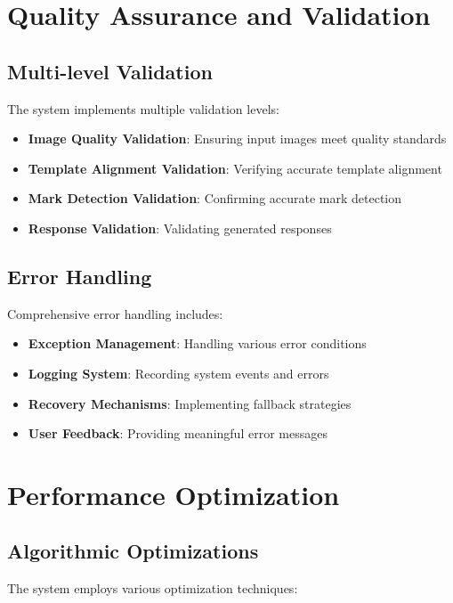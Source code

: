 \section{Quality Assurance and Validation}

\subsection{Multi-level Validation}

The system implements multiple validation levels:

\begin{itemize}
\item \textbf{Image Quality Validation}: Ensuring input images meet quality standards
\item \textbf{Template Alignment Validation}: Verifying accurate template alignment
\item \textbf{Mark Detection Validation}: Confirming accurate mark detection
\item \textbf{Response Validation}: Validating generated responses
\end{itemize}

\subsection{Error Handling}

Comprehensive error handling includes:

\begin{itemize}
\item \textbf{Exception Management}: Handling various error conditions
\item \textbf{Logging System}: Recording system events and errors
\item \textbf{Recovery Mechanisms}: Implementing fallback strategies
\item \textbf{User Feedback}: Providing meaningful error messages
\end{itemize}

\section{Performance Optimization}

\subsection{Algorithmic Optimizations}

The system employs various optimization techniques:

